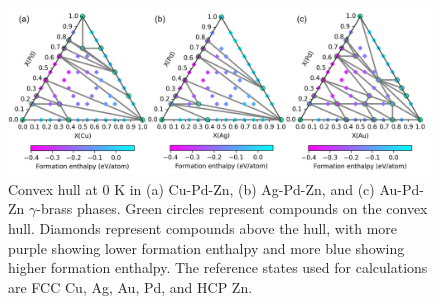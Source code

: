 \begin{figure}[H]
    \centering
    \includegraphics[width=1.0\linewidth]{intermetallics/Intermetallics-PdZnM-ConvexHull.png}
    \caption{Convex hull at 0 K in (a) Cu-Pd-Zn, (b) Ag-Pd-Zn, and (c) Au-Pd-Zn $\gamma$-brass phases. Green circles represent compounds on the convex hull. Diamonds represent compounds above the hull, with more purple showing lower formation enthalpy and more blue showing higher formation enthalpy. The reference states used for calculations are FCC Cu, Ag, Au, Pd, and HCP Zn.}
    \label{intermetallics:fig:PdZnM-ConvexHull}
\end{figure}

